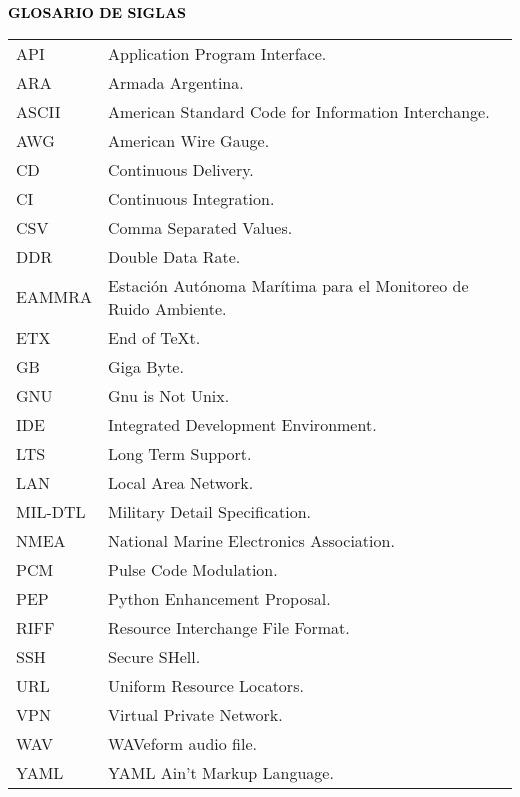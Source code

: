 
\begin{center}
	\Large\textbf{{\textcolor{black}{GLOSARIO DE SIGLAS}}}
\end{center}
\begin{tabular}{l p{12cm}}
	API		&Application Program Interface.\\		
	ARA		&Armada Argentina.\\
	ASCII	&American Standard Code for Information Interchange.\\
	AWG		&American Wire Gauge.\\
	CD		&Continuous Delivery.\\
	CI		&Continuous Integration.\\
	CSV		&Comma Separated Values.\\	
	DDR		&Double Data Rate.\\
	EAMMRA	&Estación Autónoma Marítima para el Monitoreo de Ruido Ambiente.\\
	ETX		&End of TeXt.\\
	GB		&Giga Byte.\\	
	GNU		&Gnu is Not Unix.\\
	IDE		&Integrated Development Environment.\\
	LTS		&Long Term Support.\\
	LAN		&Local Area Network.\\
	MIL-DTL	&Military Detail Specification.\\
    NMEA	&National Marine Electronics Association.\\	
	PCM		&Pulse Code Modulation.\\	
	PEP		&Python Enhancement Proposal.\\
	RIFF	&Resource Interchange File Format.\\
	SSH		&Secure SHell.\\	
	URL		&Uniform Resource Locators.\\
	VPN		&Virtual Private Network.\\
	WAV		&WAVeform audio file.\\
	YAML	&YAML Ain't Markup Language.\\
\end{tabular}

\clearpage
